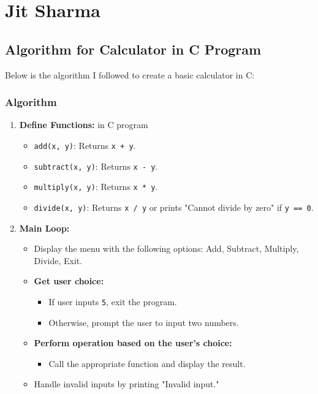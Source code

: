 \documentclass{article}
\begin{document}
\newpage
\section{Jit Sharma}

\subsection{Algorithm for Calculator in C Program}

Below is the algorithm I followed to create a basic calculator in C:

\subsubsection*{Algorithm}

\begin{enumerate}
    \item \textbf{Define Functions:} in C program
    \begin{itemize}
        \item \texttt{add(x, y)}: Returns \texttt{x + y}.
        \item \texttt{subtract(x, y)}: Returns \texttt{x - y}.
        \item \texttt{multiply(x, y)}: Returns \texttt{x * y}.
        \item \texttt{divide(x, y)}: Returns \texttt{x / y} or prints "Cannot divide by zero" if \texttt{y == 0}.
    \end{itemize}
    
    \item \textbf{Main Loop:}
    \begin{itemize}
        \item Display the menu with the following options: Add, Subtract, Multiply, Divide, Exit.
        \item \textbf{Get user choice:}
        \begin{itemize}
            \item If user inputs \texttt{5}, exit the program.
            \item Otherwise, prompt the user to input two numbers.
        \end{itemize}
        \item \textbf{Perform operation based on the user's choice:}
        \begin{itemize}
            \item Call the appropriate function and display the result.
        \end{itemize}
        \item Handle invalid inputs by printing "Invalid input."
    \end{itemize}
\end{enumerate}
\end{document}
